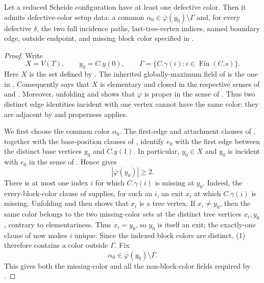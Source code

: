 \begin{lemma}
Let a reduced Scheide configuration have at least one defective color.
Then it admits defective-color setup data: a common
$\alpha_0\in\overline\varphi(y_0)\setminus\Gamma$ and, for every defective
$\delta$, the two full incidence paths, last-tree-vertex indices, named
boundary edge, outside endpoint, and missing block color specified in
.
\end{lemma}
\begin{proof}
Write
\[
 X=V(T),\qquad
 y_0=C.y(0),\qquad
 \Gamma=\{C.\gamma(i):i\in\operatorname{Fin}(C.s)\}.
\]
Here $X$ is the set defined by .  The
inherited globally-maximum field of 
is the one in .  Consequently
 says that $X$ is elementary and closed
in the respective senses of  and
.  Moreover, unfolding
 and  shows that $\varphi$ is
proper in the sense of .  Thus two distinct
edge identities incident with one vertex cannot have the same color: they
are adjacent by  and properness applies.

We first choose the common color $\alpha _0$.  The first-edge and attachment
clauses of , together with the base-position clauses
of , identify $e_0$ with the first
edge between the distinct base vertices $y_0$ and $C.y(1)$.  In particular,
$y_0\in X$ and $y_0$ is incident with $e_0$ in the sense of
.  Hence 
gives
\[
 |\overline\varphi(y_0)|\geq2. \tag{1}
\]
There is at most one index $i$ for which $C.\gamma(i)$ is missing at
$y_0$.  Indeed, the every-block-color clause of
 supplies, for such an $i$, an exit
$x_i$ at which $C.\gamma(i)$ is missing.  Unfolding
 and then  shows
that $x_i$ is a tree vertex.  If $x_i\ne y_0$,
then the same color belongs to the two missing-color sets at the distinct
tree vertices $x_i,y_0$, contrary to elementariness.  Thus $x_i=y_0$, so
$y_0$ is itself an exit; the exactly-one clause of
 now makes $i$ unique.  Since the
indexed block colors are distinct, (1) therefore contains a color outside
$\Gamma$.  Fix
\[
 \alpha _0\in\overline\varphi(y_0)\setminus\Gamma. \tag{2}
\]
This gives both the missing-color and all the non-block-color fields
required by .


\end{proof}
